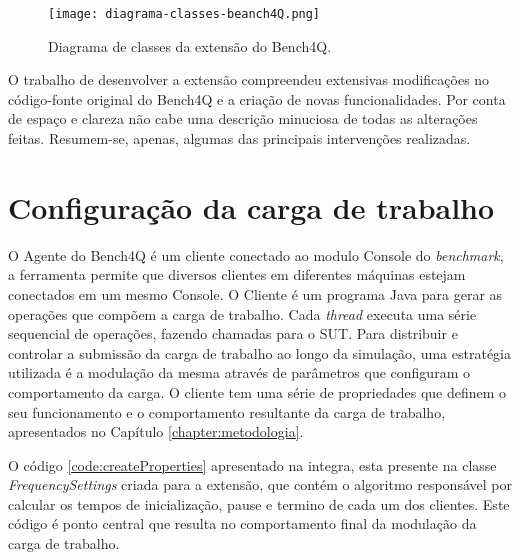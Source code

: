 \begin{figure}[!htb]
	\centering
	\texttt{[image: diagrama-classes-beanch4Q.png]}	
	\caption{Diagrama de classes da extensão do Bench4Q.}
	\label{fig:diagrama-classes}
	\fautor
\end{figure}

O trabalho de desenvolver a extensão compreendeu extensivas modificações no código-fonte original do Bench4Q e a criação de novas funcionalidades. Por conta de espaço e clareza não cabe uma descrição minuciosa de todas as alterações feitas. Resumem-se, apenas, algumas das principais intervenções realizadas.

\section{Configuração da carga de trabalho}
O Agente do Bench4Q é um cliente conectado ao modulo Console do \textit{benchmark}, a ferramenta permite que diversos clientes em diferentes máquinas estejam conectados em um mesmo Console.
O Cliente é um programa Java para gerar as operações que compõem a carga de trabalho. Cada \textit{thread} executa uma série sequencial de operações, fazendo chamadas para o SUT. Para distribuir e controlar a submissão da carga de trabalho ao longo da simulação, uma estratégia utilizada é a modulação da mesma através de parâmetros que configuram o comportamento da carga. O cliente tem uma série de propriedades que definem o seu funcionamento e o comportamento resultante da carga de trabalho, apresentados no Capítulo \ref{chapter:metodologia}. 

O código \ref{code:createProperties} apresentado na integra, esta presente na classe \textit{FrequencySettings} criada para a extensão, que contém o algoritmo responsável por calcular os tempos de inicialização, pause e termino de cada um dos clientes. Este código é ponto central que resulta no comportamento final da modulação da carga de trabalho.

